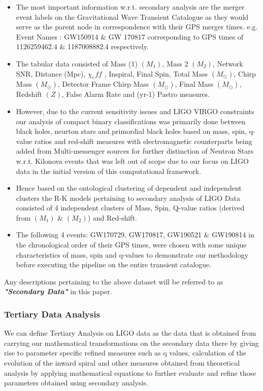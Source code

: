     \begin{itemize}
        \item The most important information w.r.t. secondary analysis are the merger event labels on the Gravitational Wave Transient Catalogue as they would serve as the parent node in correspondence with their GPS merger times. \cite{00_LIGOOpenSciData} \cite{00.2_schutz2012GWDataAnalysis} e.g. Event Names : GW150914 \& GW 170817 corresponding to GPS times of 1126259462.4 \&  1187008882.4 respectively.
        \item The tabular data consisted of Mass (1) $(M_1)$, Mass 2 $(M_2)$, Network SNR, Distance (Mpc), $\chi_eff $ , Inspiral, Final Spin, Total Mass $(M_\odot)$, Chirp Mass $(M_\odot)$, Detector Frame Chirp Mass $(M_\odot)$, Final Mass $(M_\odot)$, Redshift $(Z)$, False Alarm Rate and (yr-1) Pastro  measures.
        \item However, due to the current sensitivity issues and LIGO VIRGO constraints \cite{24.8_PBHdetectionparameters} our analysis of compact binary classifications was primarily done between black holes, neurton stars and primordial black holes based on mass, spin, q-value ratios and red-shift measures with electromagnetic counterparts being added from Multi-messenger sources for further distinction of Neutron Stars w.r.t. Kilonova events that was left out of scope due to our focus on LIGO data in the initial version of this computational framework.
        \item Hence based on the ontological clustering of dependent and independent clusters the R-K models pertaining to secondary analysis of LIGO Data consisted of 4 independent clusters of Mass, Spin, Q-value ratios (derived from $(M_1)$ \& $(M_2)$)  and Red-shift.
        \item The following 4 events: GW170729, GW170817, GW190521 \& GW190814 in the chronological order of their GPS times, were chosen with some unique characteristics of mass, spin and q-values to demonstrate our methodology before executing the pipeline on the entire transient catalogue.

    \end{itemize}

    Any descriptions pertaining to the above dataset will be referred to as \textbf{\textit{"Secondary Data"}} in this paper.

    \subsubsection{Tertiary Data Analysis}
    We can define Tertiary Analysis on LIGO data as the data that is obtained from carrying our mathematical transformations on the secondary data there by giving rise to parameter specific refined measures such as q values, calculation of the evolution of the inward spiral and other measures obtained from theoretical analysis by applying mathematical equations to further evaluate and refine those parameters obtained using secondary analysis.

